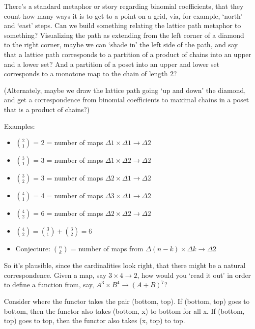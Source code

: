 \documentclass{proc-l}
\theoremstyle{definition}
\theoremstyle{remark}
\numberwithin{equation}{section}
\begin{document}
There's a standard metaphor or story regarding binomial coefficients, that they count how many ways it is to get to a point on a grid, via, for example, `north' and `east' steps. Can we build something relating the lattice path metaphor to something? Visualizing the path as extending from the left corner of a diamond to the right corner, maybe we can `shade in' the left side of the path, and say that a lattice path corresponds to a partition of a product of chains into an upper and a lower set? And a partition of a poset into an upper and lower set corresponds to a monotone map to the chain of length 2? 

(Alternately, maybe we draw the lattice path going `up and down' the diamond, and get a correspondence from binomial coefficients to maximal chains in a poset that is a product of chains?)

Examples:
\begin{itemize}
    \item \({2 \choose 1}\) = 2 = number of maps \(\Delta 1 \times \Delta 1 \to \Delta 2\)
    \item \({3 \choose 1}\) = 3 = number of maps \(\Delta 1 \times \Delta 2 \to \Delta 2\)
    \item \({3 \choose 2}\) = 3 = number of maps \(\Delta 2 \times \Delta 1 \to \Delta 2\)
    \item \({4 \choose 1}\) = 4 = number of maps \(\Delta 3 \times \Delta 1 \to \Delta 2\)
    \item \({4 \choose 2}\) = 6 = number of maps \(\Delta 2 \times \Delta 2 \to \Delta 2\)
    \item \({4 \choose 2} = {3 \choose 1} + {3 \choose 2} = 6\)

    \item Conjecture: \({n \choose k}\) = number of maps from \(\Delta (n - k) \times \Delta k \to \Delta 2\)
\end{itemize}


So it's plausible, since the cardinalities look right, that there might be a natural correspondence. Given a map, say \(3 \times 4 \to 2\), how would you `read it out' in order to define a function from, say, \(A^3 \times B^4 \to (A + B)^7\)? 

Consider where the functor takes the pair (bottom, top). If (bottom, top) goes to bottom, then the functor also takes (bottom, x) to bottom for all x. If (bottom, top) goes to top, then the functor also takes (x, top) to top.
\end{document}
